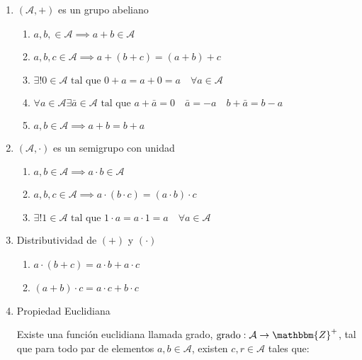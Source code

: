         \begin{enumerate}
            \item $(\mathcal{A}, +)$ es un grupo abeliano

            \begin{enumerate}
                \item $a, b, \in \mathcal{A} \implies a + b \in \mathcal{A}$
                \item $a, b, c \in \mathcal{A} \implies a + (b + c) = (a + b) + c$
                \item $\exists ! 0 \in \mathcal{A} \text{ tal que } 0 + a = a + 0 = a \quad \forall a \in \mathcal{A}$
                \item $\forall a \in \mathcal{A} \exists \bar{a} \in \mathcal{A} \text{ tal que } a + \bar{a} = 0 \quad \bar{a} = -a \quad b + \bar{a} = b - a$
                \item $a, b \in \mathcal{A} \implies a + b = b + a$
            \end{enumerate}

            \item $(\mathcal{A}, \cdot)$ es un semigrupo con unidad

            \begin{enumerate}
                \item $a, b \in \mathcal{A} \implies a \cdot b \in \mathcal{A}$
                \item $a, b, c \in \mathcal{A} \implies a \cdot (b \cdot c) = (a \cdot b) \cdot c$
                \item $\exists ! 1 \in \mathcal{A} \text{ tal que } 1 \cdot a  = a \cdot 1 = a \quad \forall a \in \mathcal{A}$
            \end{enumerate}

            \item Distributividad de $(+)$ y $(\cdot)$

            \begin{enumerate}
                \item $a \cdot (b + c) = a \cdot b + a \cdot c$
                \item $(a + b) \cdot c = a \cdot c + b \cdot c$
            \end{enumerate}

            \item Propiedad Euclidiana

            Existe una función euclidiana llamada grado, $\grado : \mathcal{A} \to \mathbbm{Z}^+$, tal que para todo par de elementos $a, b \in \mathcal{A}$, existen $c, r \in \mathcal{A}$ tales que:


\end{enumerate}
